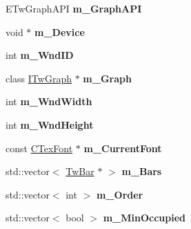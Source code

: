 \begin{DoxyCompactItemize}
\item 
\hypertarget{struct_c_tw_mgr_a31bb8b2af36840324236c0ed814d9500}{E\+Tw\+Graph\+A\+P\+I {\bfseries m\+\_\+\+Graph\+A\+P\+I}}\label{struct_c_tw_mgr_a31bb8b2af36840324236c0ed814d9500}

\item 
\hypertarget{struct_c_tw_mgr_ac123745ffe8cc09d3c27a723f31b1b49}{void $\ast$ {\bfseries m\+\_\+\+Device}}\label{struct_c_tw_mgr_ac123745ffe8cc09d3c27a723f31b1b49}

\item 
\hypertarget{struct_c_tw_mgr_a82fd7a35005622e974708e75dc60908e}{int {\bfseries m\+\_\+\+Wnd\+I\+D}}\label{struct_c_tw_mgr_a82fd7a35005622e974708e75dc60908e}

\item 
\hypertarget{struct_c_tw_mgr_abdca7a0dce64b8b33393ca238d04d10f}{class \hyperlink{class_i_tw_graph}{I\+Tw\+Graph} $\ast$ {\bfseries m\+\_\+\+Graph}}\label{struct_c_tw_mgr_abdca7a0dce64b8b33393ca238d04d10f}

\item 
\hypertarget{struct_c_tw_mgr_a726d623813bf2eb706e60dffaa8d587d}{int {\bfseries m\+\_\+\+Wnd\+Width}}\label{struct_c_tw_mgr_a726d623813bf2eb706e60dffaa8d587d}

\item 
\hypertarget{struct_c_tw_mgr_af17e471c2af7dbfe41bcd94b58aac3b0}{int {\bfseries m\+\_\+\+Wnd\+Height}}\label{struct_c_tw_mgr_af17e471c2af7dbfe41bcd94b58aac3b0}

\item 
\hypertarget{struct_c_tw_mgr_a98adf413d4bd85e94bb2f26248c65ebe}{const \hyperlink{struct_c_tex_font}{C\+Tex\+Font} $\ast$ {\bfseries m\+\_\+\+Current\+Font}}\label{struct_c_tw_mgr_a98adf413d4bd85e94bb2f26248c65ebe}

\item 
\hypertarget{struct_c_tw_mgr_a87c11a3b05496321d585a4ad5bc72b1f}{std\+::vector$<$ \hyperlink{struct_c_tw_bar}{Tw\+Bar} $\ast$ $>$ {\bfseries m\+\_\+\+Bars}}\label{struct_c_tw_mgr_a87c11a3b05496321d585a4ad5bc72b1f}

\item 
\hypertarget{struct_c_tw_mgr_a878b2aa0deb962e3f2bbbc2657aea46e}{std\+::vector$<$ int $>$ {\bfseries m\+\_\+\+Order}}\label{struct_c_tw_mgr_a878b2aa0deb962e3f2bbbc2657aea46e}

\item 
\hypertarget{struct_c_tw_mgr_acf731b238ac58dd29b38d51dd19425c3}{std\+::vector$<$ bool $>$ {\bfseries m\+\_\+\+Min\+Occupied}}\label{struct_c_tw_mgr_acf731b238ac58dd29b38d51dd19425c3}


\end{DoxyCompactItemize}

